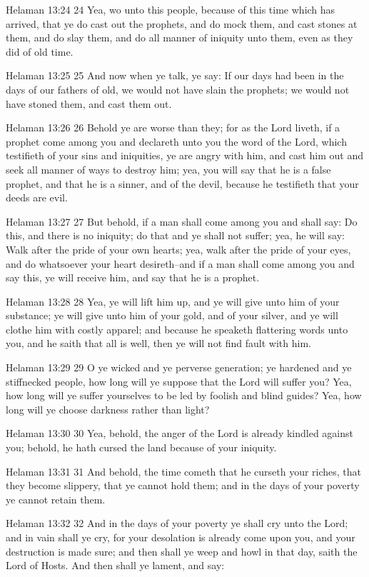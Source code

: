 Helaman 13:24
 24 Yea, wo unto this people, because of this time which has
arrived, that ye do cast out the prophets, and do mock them, and
cast stones at them, and do slay them, and do all manner of
iniquity unto them, even as they did of old time.

Helaman 13:25
 25 And now when ye talk, ye say: If our days had been in the
days of our fathers of old, we would not have slain the prophets;
we would not have stoned them, and cast them out.

Helaman 13:26
 26 Behold ye are worse than they; for as the Lord liveth, if a
prophet come among you and declareth unto you the word of the
Lord, which testifieth of your sins and iniquities, ye are angry
with him, and cast him out and seek all manner of ways to destroy
him; yea, you will say that he is a false prophet, and that he is
a sinner, and of the devil, because he testifieth that your deeds
are evil.

Helaman 13:27
 27 But behold, if a man shall come among you and shall say: Do
this, and there is no iniquity; do that and ye shall not suffer;
yea, he will say: Walk after the pride of your own hearts; yea,
walk after the pride of your eyes, and do whatsoever your heart
desireth--and if a man shall come among you and say this, ye will
receive him, and say that he is a prophet.

Helaman 13:28
 28 Yea, ye will lift him up, and ye will give unto him of your
substance; ye will give unto him of your gold, and of your
silver, and ye will clothe him with costly apparel; and because
he speaketh flattering words unto you, and he saith that all is
well, then ye will not find fault with him.

Helaman 13:29
 29 O ye wicked and ye perverse generation; ye hardened and ye
stiffnecked people, how long will ye suppose that the Lord will
suffer you? Yea, how long will ye suffer yourselves to be led by
foolish and blind guides? Yea, how long will ye choose darkness
rather than light?

Helaman 13:30
 30 Yea, behold, the anger of the Lord is already kindled against
you; behold, he hath cursed the land because of your iniquity.

Helaman 13:31
 31 And behold, the time cometh that he curseth your riches, that
they become slippery, that ye cannot hold them; and in the days
of your poverty ye cannot retain them.

Helaman 13:32
 32 And in the days of your poverty ye shall cry unto the Lord;
and in vain shall ye cry, for your desolation is already come
upon you, and your destruction is made sure; and then shall ye
weep and howl in that day, saith the Lord of Hosts. And then
shall ye lament, and say:

